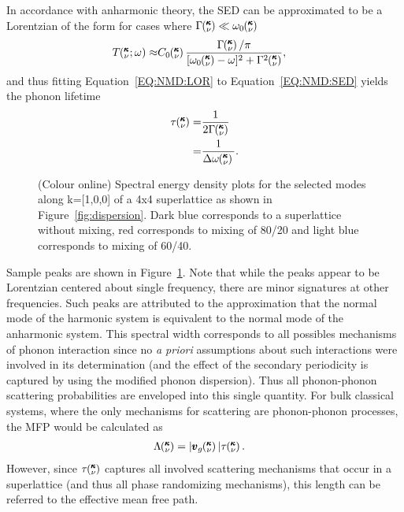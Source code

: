 In accordance with anharmonic theory, the SED can be approximated to be a  Lorentzian of the form for cases where $\Gamma\mspace{-4.0mu}\left(\mspace{-8.0mu} \begin{smallmatrix}&\pmb{\kappa} \\&\nu\end{smallmatrix} \mspace{-3.0mu}\right) \ll \omega_0\mspace{-4.0mu}\left(\mspace{-8.0mu} \begin{smallmatrix}&\pmb{\kappa} \\&\nu\end{smallmatrix} \mspace{-3.0mu}\right)$ \cite{maradudin_scattering_1962}
\begin{equation}\label{EQ:NMD:LOR}
\begin{split}
T\kvw\approx&C_0\kv\frac{\Gamma\kv/\pi}{[\omega_0\kv-\omega]^2+\Gamma^2\kv},
\end{split}
\end{equation}
and thus fitting Equation~\ref{EQ:NMD:LOR} to Equation~\ref{EQ:NMD:SED} yields the phonon lifetime
\begin{equation}\label{EQ:lifetime}
\begin{split}
\tau\kv=&\frac{1}{2\Gamma\kv}\\
	=&\frac{1}{\Delta \omega \kv {}}.
\end{split}
\end{equation}
\begin{figure}[!h]
\begin{center}
\renewcommand{\figure}{Fig.}
\caption{(Colour online) Spectral energy density plots for the selected modes along k=[1,0,0] of a 4x4 superlattice as shown in Figure~\ref{fig:dispersion}. Dark blue corresponds to a superlattice without mixing, red corresponds to mixing of 80/20 and light blue corresponds to mixing of 60/40.}
\label{fig:sed}
\end{center}
\end{figure}

Sample peaks are shown in Figure~\ref{fig:sed}. Note that while the peaks appear to be Lorentzian centered about single frequency, there are minor signatures at other frequencies. Such peaks are attributed to the approximation that the normal mode of the harmonic system is equivalent to the normal mode of the anharmonic system. This spectral width corresponds to all possibles mechanisms of phonon interaction since no \textit{a priori} assumptions about such interactions were involved in its determination (and the effect of the secondary periodicity is captured by using the modified phonon dispersion). Thus all phonon-phonon scattering probabilities are enveloped into this single quantity. For bulk classical systems, where the only mechanisms for scattering are phonon-phonon processes, the MFP would be calculated as
\begin{equation}\label{EQ:M:phonon_mfp}
\begin{split}
\Lambda\kv &= |\pmb{v}_{g}\kv {}| \tau\kv.
\end{split}
\end{equation}
However, since $\tau\mspace{-4.0mu}\left(\mspace{-8.0mu} \begin{smallmatrix}&\pmb{\kappa} \\&\nu\end{smallmatrix} \mspace{-3.0mu}\right)$ captures all involved scattering mechanisms that occur in a superlattice (and thus all phase randomizing mechanisms), this length can be referred to the effective mean free path.

